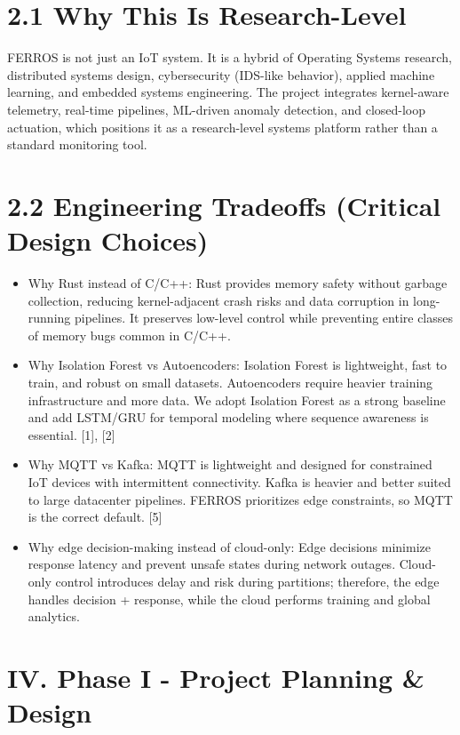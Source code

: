 \documentclass[11pt]{article}
\begin{document}
\section*{2.1 Why This Is Research-Level}
FERROS is not just an IoT system. It is a hybrid of Operating Systems research, distributed systems design, cybersecurity (IDS-like behavior), applied machine learning, and embedded systems engineering. The project integrates kernel-aware telemetry, real-time pipelines, ML-driven anomaly detection, and closed-loop actuation, which positions it as a research-level systems platform rather than a standard monitoring tool.

\section*{2.2 Engineering Tradeoffs (Critical Design Choices)}
\begin{itemize}
    \item Why Rust instead of C/C++: Rust provides memory safety without garbage collection, reducing kernel-adjacent crash risks and data corruption in long-running pipelines. It preserves low-level control while preventing entire classes of memory bugs common in C/C++.
    \item Why Isolation Forest vs Autoencoders: Isolation Forest is lightweight, fast to train, and robust on small datasets. Autoencoders require heavier training infrastructure and more data. We adopt Isolation Forest as a strong baseline and add LSTM/GRU for temporal modeling where sequence awareness is essential. [1], [2]
    \item Why MQTT vs Kafka: MQTT is lightweight and designed for constrained IoT devices with intermittent connectivity. Kafka is heavier and better suited to large datacenter pipelines. FERROS prioritizes edge constraints, so MQTT is the correct default. [5]
    \item Why edge decision-making instead of cloud-only: Edge decisions minimize response latency and prevent unsafe states during network outages. Cloud-only control introduces delay and risk during partitions; therefore, the edge handles decision + response, while the cloud performs training and global analytics.
\end{itemize}

\section{IV. Phase I - Project Planning \& Design}
\end{document}
